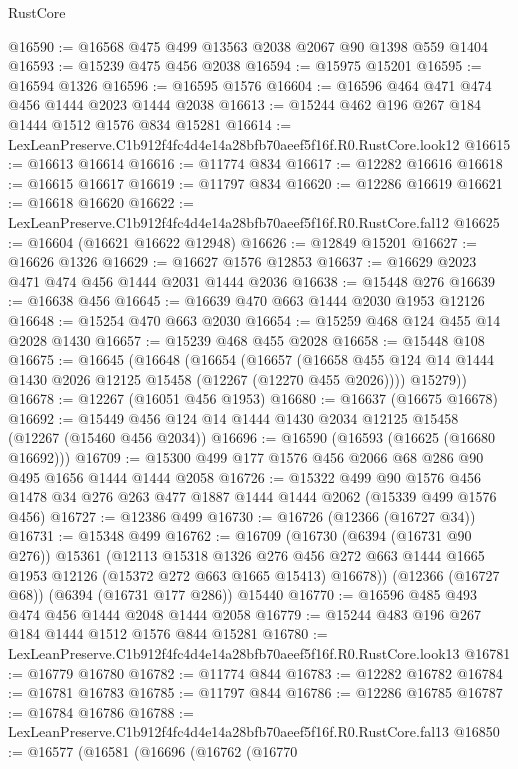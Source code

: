 \begin{lexlean}{RustCore}
\begin{coremodule}
@16590 := @16568 @475 @499 @13563 @2038 @2067 @90 @1398 @559 @1404
@16593 := @15239 @475 @456 @2038
@16594 := @15975 @15201
@16595 := @16594 @1326
@16596 := @16595 @1576
@16604 := @16596 @464 @471 @474 @456 @1444 @2023 @1444 @2038
@16613 := @15244 @462 @196 @267 @184 @1444 @1512 @1576 @834 @15281
@16614 := LexLeanPreserve.C1b912f4fc4d4e14a28bfb70aeef5f16f.R0.RustCore.look12
@16615 := @16613 @16614
@16616 := @11774 @834
@16617 := @12282 @16616
@16618 := @16615 @16617
@16619 := @11797 @834
@16620 := @12286 @16619
@16621 := @16618 @16620
@16622 := LexLeanPreserve.C1b912f4fc4d4e14a28bfb70aeef5f16f.R0.RustCore.fal12
@16625 := @16604 (@16621 @16622 @12948)
@16626 := @12849 @15201
@16627 := @16626 @1326
@16629 := @16627 @1576 @12853
@16637 := @16629 @2023 @471 @474 @456 @1444 @2031 @1444 @2036
@16638 := @15448 @276
@16639 := @16638 @456
@16645 := @16639 @470 @663 @1444 @2030 @1953 @12126
@16648 := @15254 @470 @663 @2030
@16654 := @15259 @468 @124 @455 @14 @2028 @1430
@16657 := @15239 @468 @455 @2028
@16658 := @15448 @108
@16675 := @16645
    (@16648
      (@16654
        (@16657 (@16658 @455 @124 @14 @1444 @1430 @2026 @12125 @15458 (@12267 (@12270 @455 @2026))))
        @15279))
@16678 := @12267 (@16051 @456 @1953)
@16680 := @16637 (@16675 @16678)
@16692 := @15449 @456 @124 @14 @1444 @1430 @2034 @12125 @15458 (@12267 (@15460 @456 @2034))
@16696 := @16590 (@16593 (@16625 (@16680 @16692)))
@16709 := @15300 @499 @177 @1576 @456 @2066 @68 @286 @90 @495 @1656 @1444 @1444 @2058
@16726 := @15322
    @499
    @90
    @1576
    @456
    @1478
    @34
    @276
    @263
    @477
    @1887
    @1444
    @1444
    @2062
    (@15339 @499 @1576 @456)
@16727 := @12386 @499
@16730 := @16726 (@12366 (@16727 @34))
@16731 := @15348 @499
@16762 := @16709
    (@16730
      (@6394 (@16731 @90 @276))
      @15361
      (@12113
        @15318
        @1326
        @276
        @456
        @272
        @663
        @1444
        @1665
        @1953
        @12126
        (@15372 @272 @663 @1665 @15413)
        @16678))
    (@12366 (@16727 @68))
    (@6394 (@16731 @177 @286))
    @15440
@16770 := @16596 @485 @493 @474 @456 @1444 @2048 @1444 @2058
@16779 := @15244 @483 @196 @267 @184 @1444 @1512 @1576 @844 @15281
@16780 := LexLeanPreserve.C1b912f4fc4d4e14a28bfb70aeef5f16f.R0.RustCore.look13
@16781 := @16779 @16780
@16782 := @11774 @844
@16783 := @12282 @16782
@16784 := @16781 @16783
@16785 := @11797 @844
@16786 := @12286 @16785
@16787 := @16784 @16786
@16788 := LexLeanPreserve.C1b912f4fc4d4e14a28bfb70aeef5f16f.R0.RustCore.fal13
@16850 := @16577
    (@16581
      (@16696
        (@16762
          (@16770

\end{coremodule}
\end{lexlean}
